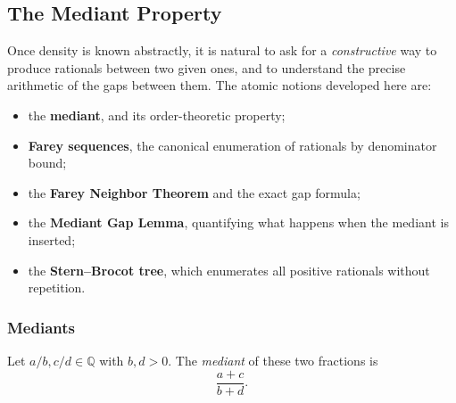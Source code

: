 
\subsection{The Mediant Property}
\label{sec:mediant}

\begin{tcolorbox}[
  colback=gray!6,
  colframe=gray!40,
  arc=2pt,
  left=8pt, right=8pt, top=6pt, bottom=6pt,
  title={\small\textbf{Toolkit: Mediants, Farey Sequences, and Stern--Brocot}},
  fonttitle=\small\bfseries
]
Once density is known abstractly, it is natural to ask for a \emph{constructive}
way to produce rationals between two given ones, and to understand the precise
arithmetic of the gaps between them.  The atomic notions developed here are:
\begin{itemize}
  \item the \textbf{mediant}, and its order-theoretic property;
  \item \textbf{Farey sequences}, the canonical enumeration of rationals by
        denominator bound;
  \item the \textbf{Farey Neighbor Theorem} and the exact gap formula;
  \item the \textbf{Mediant Gap Lemma}, quantifying what happens when the
        mediant is inserted;
  \item the \textbf{Stern--Brocot tree}, which enumerates all positive rationals
        without repetition.
\end{itemize}
\end{tcolorbox}

\subsubsection{Mediants}

\begin{tcolorbox}[colback=defbox, colframe=defborder, arc=2pt,
  left=6pt, right=6pt, top=4pt, bottom=4pt,
  title={\small\textbf{Definition (Mediant)}},
  fonttitle=\small\bfseries]
\begin{definition}[Mediant]
\label{def:mediant}
Let $a/b, c/d \in \mathbb{Q}$ with $b, d > 0$.
The \emph{mediant} of these two fractions is
\[
\frac{a+c}{b+d}.
\]
\end{definition}
\end{tcolorbox}

